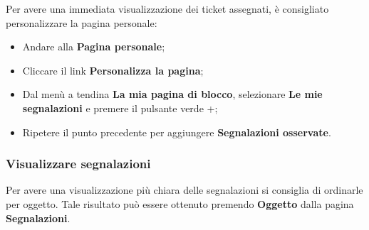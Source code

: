	Per avere una immediata visualizzazione dei ticket assegnati, \`{e} consigliato personalizzare 
	la pagina personale: 
	\begin{itemize}
		\item Andare alla \textbf{Pagina personale}; 
		\item Cliccare il link \textbf{Personalizza la pagina}; 
		\item Dal men\`{u} a tendina \textbf{La mia pagina di blocco}, selezionare \textbf{Le mie segnalazioni} 
		e premere il pulsante verde +; 
		\item Ripetere il punto precedente per aggiungere \textbf{Segnalazioni osservate}. 
	
	\end{itemize}

	
\subsubsection{Visualizzare segnalazioni}

	Per avere una visualizzazione pi\`{u} chiara delle segnalazioni si consiglia di ordinarle per 
	oggetto. Tale risultato pu\`{o} essere ottenuto premendo \textbf{Oggetto} dalla pagina \textbf{Segnalazioni}.


